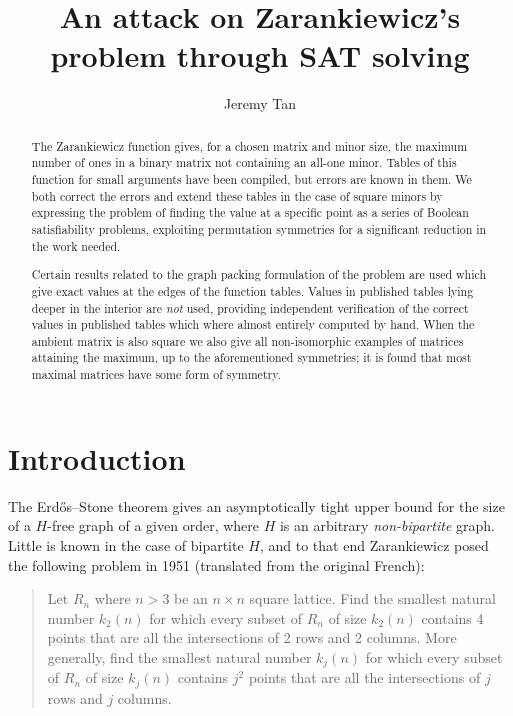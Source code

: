 \documentclass[10pt,a4paper]{article}
\title{An attack on Zarankiewicz's problem through SAT solving}
\author{Jeremy Tan}
\theoremstyle{definition}
\begin{document}
	
	\maketitle
	
	\begin{abstract}
		The Zarankiewicz function gives, for a chosen matrix and minor size, the maximum number of ones in a binary matrix not containing an all-one minor. Tables of this function for small arguments have been compiled, but errors are known in them. We both correct the errors and extend these tables in the case of square minors by expressing the problem of finding the value at a specific point as a series of Boolean satisfiability problems, exploiting permutation symmetries for a significant reduction in the work needed.
		
		Certain results related to the graph packing formulation of the problem are used which give exact values at the edges of the function tables. Values in published tables lying deeper in the interior are \textit{not} used, providing independent verification of the correct values in published tables which where almost entirely computed by hand. When the ambient matrix is also square we also give all non-isomorphic examples of matrices attaining the maximum, up to the aforementioned symmetries; it is found that most maximal matrices have some form of symmetry.
	\end{abstract}
	
	\section{Introduction}
	
	The Erdős--Stone theorem \cite{erdosstone} gives an asymptotically tight upper bound for the size of a $H$-free graph of a given order, where $H$ is an arbitrary \textit{non-bipartite} graph. Little is known in the case of bipartite $H$, and to that end Zarankiewicz \cite{origin} posed the following problem in 1951 (translated from the original French):
	
	\begin{quotation}
		Let $R_n$ where $n>3$ be an $n\times n$ square lattice. Find the smallest natural number $k_2(n)$ for which every subset of $R_n$ of size $k_2(n)$ contains 4 points that are all the intersections of 2 rows and 2 columns. More generally, find the smallest natural number $k_j(n)$ for which every subset of $R_n$ of size $k_j(n)$ contains $j^2$ points that are all the intersections of $j$ rows and $j$ columns.
	\end{quotation}
	
\end{document}

